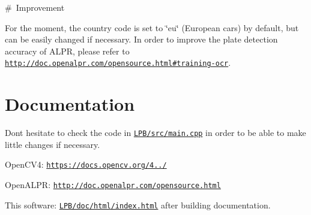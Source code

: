 \# \+Improvement

For the moment, the country code is set to \char`\"{}eu\char`\"{} (European cars) by default, but can be easily changed if necessary. In order to improve the plate detection accuracy of A\+L\+PR, please refer to \href{http://doc.openalpr.com/opensource.html#training-ocr}{\tt http\+://doc.\+openalpr.\+com/opensource.\+html\#training-\/ocr}.

\section*{Documentation}

Don\textquotesingle{}t hesitate to check the code in \href{LPB/src/main.cpp}{\tt L\+P\+B/src/main.\+cpp} in order to be able to make little changes if necessary.


\begin{DoxyItemize}
\item Open\+C\+V4\+: \href{https://docs.opencv.org/4.0.1/}{\tt https\+://docs.\+opencv.\+org/4../}
\item Open\+A\+L\+PR\+: \href{http://doc.openalpr.com/opensource.html}{\tt http\+://doc.\+openalpr.\+com/opensource.\+html}
\item This software\+: \href{LPB/doc/html/index.html}{\tt L\+P\+B/doc/html/index.\+html} after building documentation. 
\end{DoxyItemize}